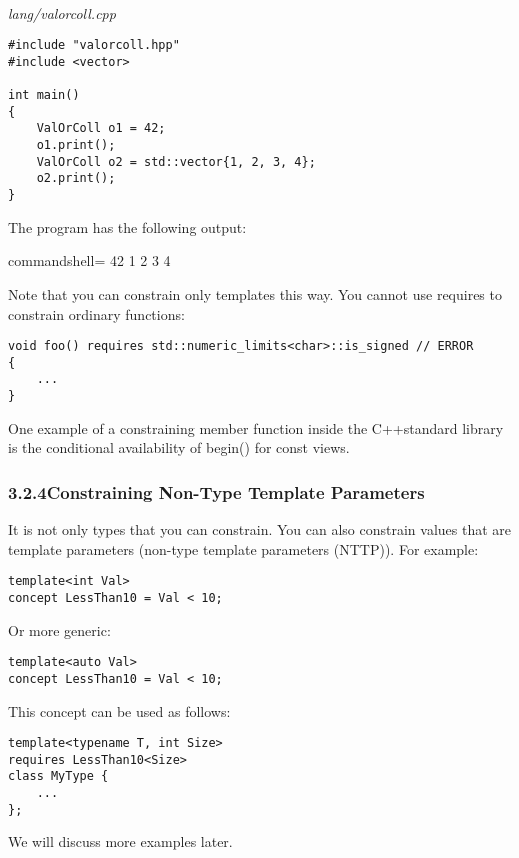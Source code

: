 \noindent
\hspace*{\fill} \\ %
\textit{lang/valorcoll.cpp}

\begin{lstlisting}[style=styleCXX]
#include "valorcoll.hpp"
#include <vector>

int main()
{
	ValOrColl o1 = 42;
	o1.print();
	ValOrColl o2 = std::vector{1, 2, 3, 4};
	o2.print();
}
\end{lstlisting}

The program has the following output:

\begin{tcblisting}{commandshell={}}
42
1 2 3 4
\end{tcblisting}

Note that you can constrain only templates this way. You cannot use requires to constrain ordinary functions:

\begin{lstlisting}[style=styleCXX]
void foo() requires std::numeric_limits<char>::is_signed // ERROR
{
	...
}
\end{lstlisting}

One example of a constraining member function inside the C++standard library is the conditional availability of begin() for const views.


\subsubsection*{ 3.2.4\hspace{0.2cm}Constraining Non-Type Template Parameters}

It is not only types that you can constrain. You can also constrain values that are template parameters (non-type template parameters (NTTP)). For example:

\begin{lstlisting}[style=styleCXX]
template<int Val>
concept LessThan10 = Val < 10;
\end{lstlisting}

Or more generic:

\begin{lstlisting}[style=styleCXX]
template<auto Val>
concept LessThan10 = Val < 10;
\end{lstlisting}

This concept can be used as follows:

\begin{lstlisting}[style=styleCXX]
template<typename T, int Size>
requires LessThan10<Size>
class MyType {
	...
};
\end{lstlisting}

We will discuss more examples later.










